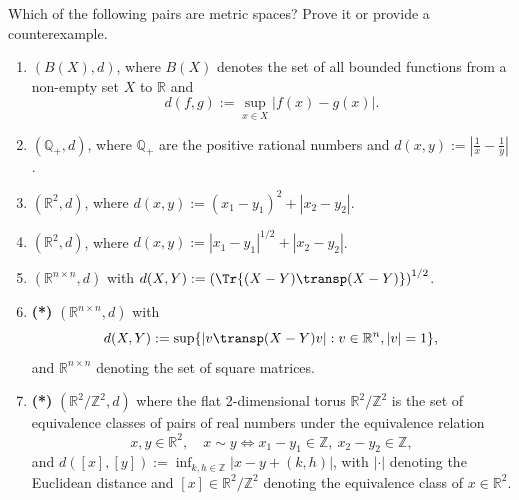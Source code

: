 \begin{exercise}
\label{ex:metric_space_examples}
Which of the following pairs are metric spaces? Prove it or provide a counterexample.
\begin{enumerate}[label=\textbf{(\alph*)}]
  \item $(B(X), d)$, where $B(X)$ denotes the set of all bounded functions from a non-empty set
    $X$ to $\mathbb{R}$ and
    $$d(f,g) := \sup_{x \in X} |f(x) - g(x)|.$$
  \item $(\mathbb{Q}_+, d)$, where $\mathbb{Q}_+$ are the positive rational numbers and
    $d(x,y) := \left|\tfrac{1}{x} - \tfrac{1}{y}\right|$.
  \item $(\mathbb{R}^2, d)$, where $d(x,y) := (x_1 - y_1)^2 + |x_2 - y_2|$.
  \item $(\mathbb{R}^2, d)$, where $d(x,y) := |x_1 - y_1|^{1/2} + |x_2 - y_2|$.
  \item $(\mathbb{R}^{n \times n}, d)$ with
    $d(X,Y) := \left(\Tr\{(X-Y)\transp(X-Y)\}\right)^{1/2}$.
  \item \textbf{(*)} $(\mathbb{R}^{n \times n}, d)$ with
    $$d(X,Y) := \sup\{|v\transp(X-Y)v| : v \in \mathbb{R}^n, |v| = 1\},$$
    and $\mathbb{R}^{n\times n}$ denoting the set of square matrices.
  \item \textbf{(*)} $(\mathbb{R}^2/\mathbb{Z}^2, d)$ where the flat 2-dimensional torus
    $\mathbb{R}^2/\mathbb{Z}^2$ is the set of equivalence classes of pairs of real numbers under
    the equivalence relation
    $$x, y \in \mathbb{R}^2, \quad x \sim y \iff x_1 - y_1 \in \mathbb{Z},\ x_2 - y_2 \in \mathbb{Z},$$
    and $d([x],[y]) := \inf_{k,h \in \mathbb{Z}} |x - y + (k,h)|$, with $|\cdot|$ denoting the
    Euclidean distance and $[x] \in \mathbb{R}^2/\mathbb{Z}^2$ denoting the equivalence class of
    $x \in \mathbb{R}^2$.
\end{enumerate}

\end{exercise}

